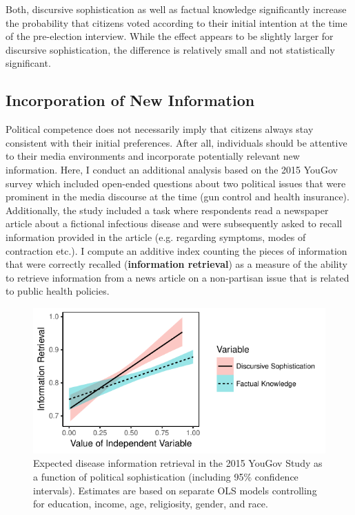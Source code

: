 \documentclass[12pt]{article}
\begin{document}
Both, discursive sophistication as well as factual knowledge significantly increase the probability that citizens voted according to their initial intention at the time of the pre-election interview. While the effect appears to be slightly larger for discursive sophistication, the difference is relatively small and not statistically significant.


\subsection*{Incorporation of New Information}

Political competence does not necessarily imply that citizens always stay consistent with their initial preferences. After all, individuals should be attentive to their media environments and incorporate potentially relevant new information. Here, I conduct an additional analysis based on the 2015 YouGov survey which included open-ended questions about two political issues that were prominent in the media discourse at the time (gun control and health insurance). Additionally, the study included a task where respondents read a newspaper article about a fictional infectious disease and were subsequently asked to recall information provided in the article (e.g. regarding symptoms, modes of contraction etc.). I compute an additive index counting the pieces of information that were correctly recalled (\textbf{information retrieval}) as a measure of the ability to retrieve information from a news article on a non-partisan issue that is related to public health policies. 

\begin{figure}[h]\centering
\includegraphics{../fig/yg_disease.pdf}
\caption{Expected disease information retrieval in the 2015 YouGov Study as a function of political sophistication (including 95\% confidence intervals). Estimates are based on separate OLS models controlling for education, income, age, religiosity, gender, and race.}\label{fig:yg_corplot}
\end{figure}
\end{document}
